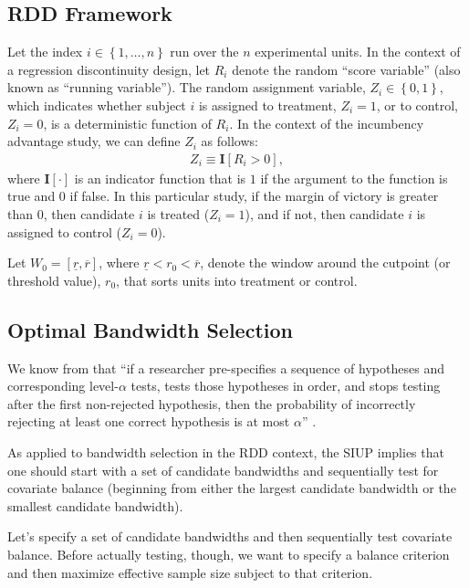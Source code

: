 \documentclass[11pt,leqno]{article}\usepackage[]{graphicx}\usepackage[]{color}
\theoremstyle{newstyle}
\begin{document}
\subsection{RDD Framework}

Let the index $i \in \left\{1, \dots , n\right\}$ run over the $n$ experimental units. In the context of a regression discontinuity design, let $R_i$ denote the random ``score variable'' (also known as ``running variable''). The random assignment variable, $Z_i \in \left\{0, 1\right\}$, which indicates whether subject $i$ is assigned to treatment, $Z_i = 1$, or to control, $Z_i = 0$, is a deterministic function of $R_i$. In the context of the incumbency advantage study, we can define $Z_i$ as follows:
\begin{align*}
Z_i \equiv \mathbf{I}\left[R_i > 0 \right],
\end{align*}
where $\mathbf{I}\left[\cdot\right]$ is an indicator function that is $1$ if the argument to the function is true and $0$ if false. In this particular study, if the margin of victory is greater than $0$, then candidate $i$ is treated ($Z_i = 1$), and if not, then candidate $i$ is assigned to control ($Z_i = 0$).

Let $W_0 = [\underline{r}, \overline{r}]$, where $\underline{r} < r_0 < \overline{r}$, denote the window around the cutpoint (or threshold value), $r_0$, that sorts units into treatment or control.


\subsection{Optimal Bandwidth Selection}

We know from \citet{hansensales2015, rosenbaum2008, berger1988} that ``if a researcher pre-specifies a sequence of hypotheses and corresponding level-$\alpha$ tests, tests those hypotheses in order, and stops testing after the first non-rejected hypothesis, then the probability of incorrectly rejecting at least one correct hypothesis is at most $\alpha$'' \citep[p. 185]{hansensales2015}.

As applied to bandwidth selection in the RDD context, the SIUP implies that one should start with a set of candidate bandwidths and sequentially test for covariate balance (beginning from either the largest candidate bandwidth or the smallest candidate bandwidth).

Let's specify a set of candidate bandwidths and then sequentially test covariate balance. Before actually testing, though, we want to specify a balance criterion and then maximize effective sample size subject to that criterion.
\end{document}
